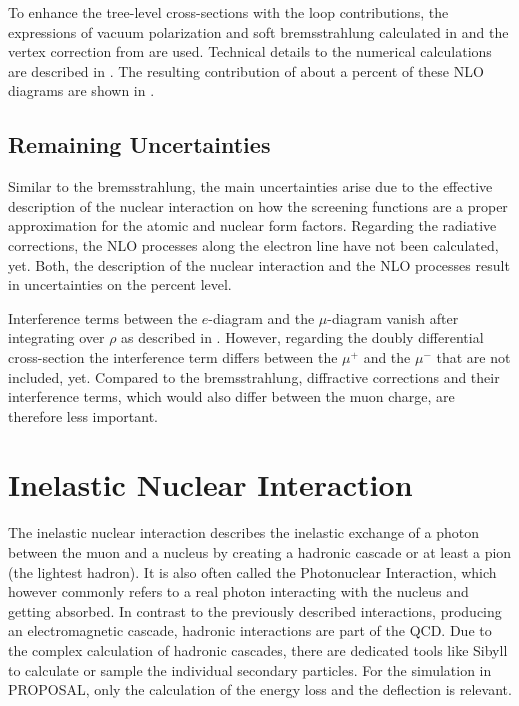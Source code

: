To enhance the tree-level cross-sections with the loop contributions, the expressions of vacuum polarization and soft bremsstrahlung calculated in \cite{Mork65} and the vertex correction from \cite{Akhiezer81} are used.
Technical details to the numerical calculations are described in .
The resulting contribution of about a percent of these NLO diagrams are shown in .

\subsection{Remaining Uncertainties}

Similar to the bremsstrahlung, the main uncertainties arise due to the effective description of the nuclear interaction on how the screening functions are a proper approximation for the atomic and nuclear form factors.
Regarding the radiative corrections, the NLO processes along the electron line have not been calculated, yet.
Both, the description of the nuclear interaction and the NLO processes result in uncertainties on the percent level. \cite{Sandrock20ICPPA}

Interference terms between the $e$-diagram and the $\mu$-diagram vanish after integrating over $\rho$ as described in \cite{Kelner67}.
However, regarding the doubly differential cross-section the interference term differs between the $\mu^+$ and the $\mu^-$ that are not included, yet.
Compared to the bremsstrahlung, diffractive corrections and their interference terms, which would also differ between the muon charge, are therefore less important.

%
% 
%
%

\section{Inelastic Nuclear Interaction} \label{sec:photonucl}

The inelastic nuclear interaction describes the inelastic exchange of a photon between the muon and a nucleus by creating a hadronic cascade or at least a pion (the lightest hadron).
It is also often called the Photonuclear Interaction, which however commonly refers to a real photon interacting with the nucleus and getting absorbed.
In contrast to the previously described interactions, producing an electromagnetic cascade, hadronic interactions are part of the QCD.
Due to the complex calculation of hadronic cascades, there are dedicated tools like Sibyll \cite{Riehn20Sibyll} to calculate or sample the individual secondary particles.
For the simulation in PROPOSAL, only the calculation of the energy loss and the deflection is relevant.

